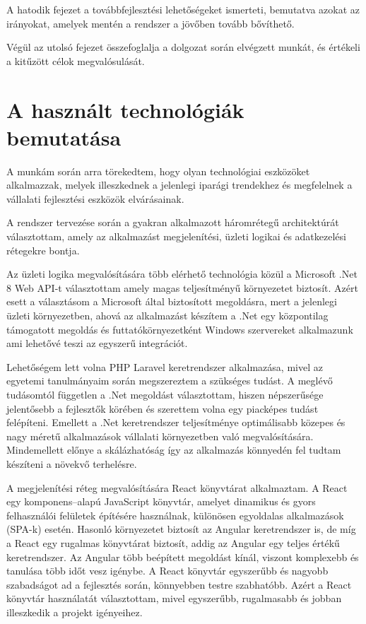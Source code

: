 \documentclass[
]{thesis-ekf}
\theoremstyle{definition}
\theoremstyle{remark}
\begin{document}
A hatodik fejezet a továbbfejlesztési lehetőségeket ismerteti, bemutatva azokat az irányokat, amelyek mentén a rendszer a jövőben tovább bővíthető.

Végül az utolsó fejezet összefoglalja a dolgozat során elvégzett munkát, és értékeli a kitűzött célok megvalósulását.

\section{A használt technológiák bemutatása}
A munkám során arra törekedtem, hogy olyan technológiai eszközöket alkalmazzak, melyek illeszkednek a jelenlegi iparági trendekhez és megfelelnek a vállalati fejlesztési eszközök elvárásainak.

A rendszer tervezése során a gyakran alkalmazott háromrétegű architektúrát választottam, amely az alkalmazást megjelenítési, üzleti logikai és adatkezelési rétegekre bontja.

Az üzleti logika megvalósítására több elérhető technológia közül a Microsoft .Net 8 Web API-t választottam amely magas teljesítményű környezetet biztosít.
Azért esett a választásom a Microsoft által biztosított megoldásra, mert a jelenlegi üzleti környezetben, ahová az alkalmazást készítem a .Net egy központilag támogatott megoldás és futtatókörnyezetként Windows szervereket alkalmazunk ami lehetővé teszi az egyszerű integrációt.

Lehetőségem lett volna PHP Laravel keretrendszer alkalmazása, mivel az egyetemi tanulmányaim során megszereztem a szükséges tudást. 
A meglévő tudásomtól független a .Net megoldást választottam, hiszen népszerűsége jelentősebb a fejlesztők körében és szerettem volna egy piacképes tudást felépíteni. \cite{TechnologyUsage}
Emellett a .Net keretrendszer teljesítménye optimálisabb közepes és nagy méretű alkalmazások vállalati környezetben való megvalósítására.
Mindemellett előnye a skálázhatóság így az alkalmazás könnyedén fel tudtam készíteni a növekvő terhelésre.

A megjelenítési réteg megvalósítására React könyvtárat alkalmaztam. A React egy komponens--alapú JavaScript könyvtár, amelyet dinamikus és gyors felhasználói felületek építésére használnak, különösen egyoldalas alkalmazások (SPA-k) esetén. \cite{React}
Hasonló környezetet biztosít az Angular keretrendszer is, de míg a React egy rugalmas könyvtárat biztosít, addig az Angular egy teljes értékű keretrendszer. Az Angular több beépített megoldást kínál, viszont komplexebb és tanulása több időt vesz igénybe. A React könyvtár egyszerűbb és nagyobb szabadságot ad a fejlesztés során, könnyebben testre szabhatóbb.
Azért a React könyvtár használatát választottam, mivel egyszerűbb, rugalmasabb és jobban illeszkedik a projekt igényeihez.
\end{document}
